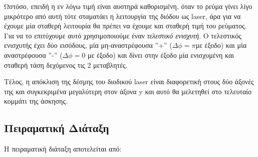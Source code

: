 \documentclass[a4paper]{article}
\begin{document}
	Ωστόσο, επειδή η εν λόγω τιμή είναι αυστηρά καθορισμένη, όταν το ρεύμα γίνει λίγο μικρότερο από αυτή τότε σταματάει η λειτουργία της διόδου ως laser, άρα για να έχουμε μία σταθερή λειτουρία θα πρέπει να έχουμε και σταθερή τιμή του ρεύματος. Για να το επιτύχουμε αυτό χρησιμοποιούμε έναν \textit{τελεστικό ενισχυτή}. Ο τελεστικός ενισχυτής έχει δύο εισόδους, μία μη-αναστρέφουσα ''+'' ($\Delta\phi =\pi$με έξοδο) και μία αναστρέφουσα ''-'' ($\Delta\phi = 0$ με έξοδο) και δίνει στην έξοδο μία ενισχυμένη και σταθερή τάση δεχόμενος τις 2 μεταβλητές.
 	
 	Τέλος, η απόκλιση της δέσμης του διοδικού laser είναι διαφορετική στους δύο άξονές της και συγκεκριμένα μεγαλύτερη στον άξονα y και αυτό θα μελετηθεί στο τελευταίο κομμάτι της άσκησης.
 	
\subsection*{Πειραματική Διάταξη}
	Η πειραματική διάταξη αποτελείται από: 
\end{document}
